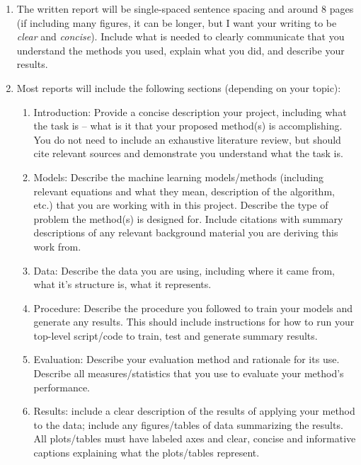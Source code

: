 \documentclass[10pt]{article}
\begin{document}
\begin{enumerate}
\begin{enumerate}
\item The written report will be single-spaced sentence spacing and around 8 pages (if including many figures, it can be longer, but I want your writing to be {\em clear} and {\em concise}). Include what is needed to clearly communicate that you understand the methods you used, explain what you did, and describe your results.
\item Most reports will include the following sections (depending on your topic):
\begin{enumerate}
\item Introduction: Provide a concise description your project, including what the task is -- what is it that your proposed method(s) is accomplishing. You do not need to include an exhaustive literature review, but should cite relevant sources and demonstrate you understand what the task is. 
\item Models: Describe the machine learning models/methods (including relevant equations and what they mean, description of the algorithm, etc.) that you are working with in this project. Describe the type of problem the method(s) is designed for. Include citations with summary descriptions of any relevant background material you are deriving this work from. 
\item Data: Describe the data you are using, including where it came from, what it's structure is, what it represents.
\item Procedure: Describe the procedure you followed to train your models and generate any results. This should include instructions for how to run your top-level script/code to train, test and generate summary results.
\item Evaluation: Describe your evaluation method and rationale for its use. Describe all measures/statistics that you use to evaluate your method's performance.
\item Results: include a clear description of the results of applying your method to the data; include any figures/tables of data summarizing the results.  All plots/tables must have labeled axes and clear, concise and informative captions explaining what the plots/tables represent.
\end{enumerate}
\end{enumerate}
\end{enumerate}
\end{document}
